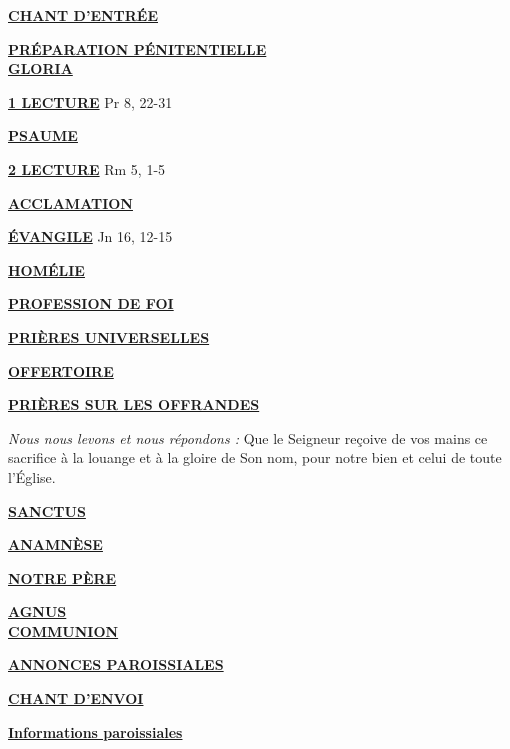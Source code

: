 \documentclass[french,11pt,a4paper]{article}
\newcommand*{\chants}{../chants}
\newcommand*{\messe}{../messe_bienveillance}
\newcommand*{\pu}{../pu}
\newcommand*{\psaumes}{../psaumes}
\newcommand{\NewsItem}[1]{%
\vspace{3pt}
\underline{\textbf{#1}}
		  }
\begin{document}
\NewsItem{CHANT D'ENTRÉE}
	

\NewsItem{PRÉPARATION PÉNITENTIELLE} \\
	

\NewsItem{GLORIA}
	


\NewsItem{1\iere{} LECTURE} Pr 8, 22-31

\NewsItem{PSAUME}


\NewsItem{2\ieme{} LECTURE} Rm 5, 1-5

\NewsItem{ACCLAMATION}
%

\NewsItem{ÉVANGILE} Jn 16, 12-15

\NewsItem{HOMÉLIE}

\NewsItem{PROFESSION DE FOI}


\NewsItem{PRIÈRES UNIVERSELLES} 


\NewsItem{OFFERTOIRE}

\NewsItem{PRIÈRES SUR LES OFFRANDES}
\textit{Nous nous levons et nous répondons : }
Que le Seigneur reçoive de vos mains ce sacrifice à la louange et à la gloire 
de Son nom, pour notre bien et celui de toute l’Église.

\NewsItem{SANCTUS}


\NewsItem{ANAMNÈSE}


\NewsItem{NOTRE PÈRE}

\NewsItem{AGNUS} \\


\NewsItem{COMMUNION}


\NewsItem{ANNONCES PAROISSIALES}

\NewsItem{CHANT D'ENVOI}


\newpage



\NewsItem{Informations paroissiales}
\end{document}
